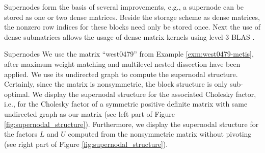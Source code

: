 Supernodes form the basis of several improvements, e.g.,
a supernode can be stored as one or two dense matrices. 
Beside the storage scheme as dense matrices, the nonzero row indices
for these blocks need only be stored once.
Next the use of dense submatrices allows the usage of dense matrix kernels
using level-3 BLAS
\cite{DodL85,DonDHH88}. 
\begin{example}{Supernodes}\label{exm:supernodes}
We use the matrix ``west0479'' from Example \ref{exm:west0479-metis},
after maximum weight matching and multilevel nested dissection have
been applied. 
We use its undirected graph to compute the supernodal
structure. Certainly, since the matrix is nonsymmetric, the block structure
is only sub-optimal. We display the supernodal structure for the associated
Cholesky factor, i.e., for the Cholesky factor of a symmetric positive definite
matrix with same undirected graph as our matrix (see
left part of Figure \ref{fig:supernodal_structure}). Furthermore, we display
the supernodal structure for the factors $L$ and $U$ computed from the
nonsymmetric matrix without pivoting (see right part of Figure \ref{fig:supernodal_structure}).
\end{example}

